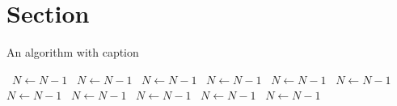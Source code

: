\documentclass[a4paper]{article}
\begin{document}
\section{Section}

\begin{algorithm}
\caption{An algorithm with caption}
\begin{algorithmic}
\    \State $N \gets N - 1$
\    \State $N \gets N - 1$
\    \State $N \gets N - 1$
\    \State $N \gets N - 1$
\    \State $N \gets N - 1$
\    \State $N \gets N - 1$
\    \State $N \gets N - 1$
\    \State $N \gets N - 1$
\    \State $N \gets N - 1$
\    \State $N \gets N - 1$
\    \State $N \gets N - 1$
\EndWhile
\end{algorithmic}
\end{algorithm}
\end{document}
